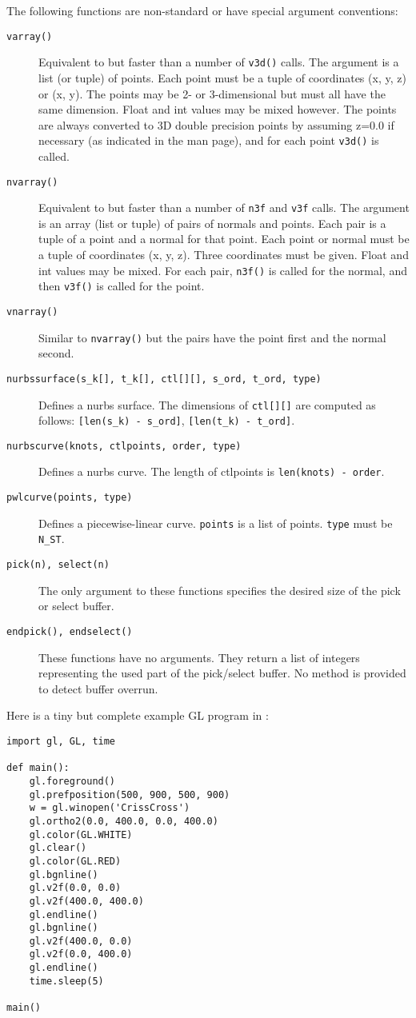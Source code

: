 The following functions are non-standard or have special argument
conventions:
\begin{description}
\item[{\tt varray()}]
Equivalent to but faster than a number of
{\tt v3d()}
calls.
The argument is a list (or tuple) of points.
Each point must be a tuple of coordinates (x, y, z) or (x, y).
The points may be 2- or 3-dimensional but must all have the
same dimension.
Float and int values may be mixed however.
The points are always converted to 3D double precision points
by assuming z=0.0 if necessary (as indicated in the man page),
and for each point
{\tt v3d()}
is called.
\item[{\tt nvarray()}]
Equivalent to but faster than a number of
{\tt n3f}
and
{\tt v3f}
calls.
The argument is an array (list or tuple) of pairs of normals and points.
Each pair is a tuple of a point and a normal for that point.
Each point or normal must be a tuple of coordinates (x, y, z).
Three coordinates must be given.
Float and int values may be mixed.
For each pair,
{\tt n3f()}
is called for the normal, and then
{\tt v3f()}
is called for the point.
\item[{\tt vnarray()}]
Similar to 
{\tt nvarray()}
but the pairs have the point first and the normal second.
\item[{\tt nurbssurface(s\_k[], t\_k[], ctl[][], s\_ord, t\_ord, type)}]
\itembreak
Defines a nurbs surface.
The dimensions of
{\tt ctl[][]}
are computed as follows:
{\tt [len(s\_k)~-~s\_ord]},
{\tt [len(t\_k)~-~t\_ord]}.
\item[{\tt nurbscurve(knots, ctlpoints, order, type)}]
Defines a nurbs curve.
The length of ctlpoints is
{\tt len(knots)~-~order}.
\item[{\tt pwlcurve(points, type)}]
Defines a piecewise-linear curve.
{\tt points}
is a list of points.
{\tt type}
must be
{\tt N\_ST}.
\item[{\tt pick(n), select(n)}]
The only argument to these functions specifies the desired size of the
pick or select buffer.
\item[{\tt endpick(), endselect()}]
These functions have no arguments.
They return a list of integers representing the used part of the
pick/select buffer.
No method is provided to detect buffer overrun.
\end{description}

Here is a tiny but complete example GL program in {\Python}:
\bcode\begin{verbatim}
import gl, GL, time

def main():
    gl.foreground()
    gl.prefposition(500, 900, 500, 900)
    w = gl.winopen('CrissCross')
    gl.ortho2(0.0, 400.0, 0.0, 400.0)
    gl.color(GL.WHITE)
    gl.clear()
    gl.color(GL.RED)
    gl.bgnline()
    gl.v2f(0.0, 0.0)
    gl.v2f(400.0, 400.0)
    gl.endline()
    gl.bgnline()
    gl.v2f(400.0, 0.0)
    gl.v2f(0.0, 400.0)
    gl.endline()
    time.sleep(5)

main()
\end{verbatim}\ecode

